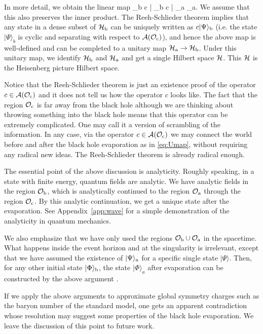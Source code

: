 \documentclass[a4paper,11pt]{article}
\theoremstyle{plain}
\theoremstyle{definition}
\numberwithin{thm}{section}
\newcommand{\ket}[1]{ | {#1} \rangle }
\def\CA{{\cal A}}
\def\CH{{\cal H}}
\def\CO{{\cal O}}
\def\beq#1\eeq{\begin{align}#1\end{align}}
\begin{document}
In more detail, we obtain the linear map
\beq
\CH_{\rm b} \ni c\ket{\Psi}_{\rm b} \mapsto c\ket{\Psi}_{\rm a} \in \CH_{\rm a}. \label{eq:Umap}
\eeq
We assume that this also preserves the inner product. The Reeh-Schlieder theorem implies that any state in a dense subset of $\CH_{\rm b}$ can be uniquely written as $c\ket{\Psi}_{\rm b}$ (i.e.
the state $\ket{\Psi}_b$ is cyclic and separating with respect to $\CA(\CO_{\rm c})$), and hence the above map is well-defined and can be completed to a unitary map $\CH_{\rm a} \to \CH_{\rm b}$.
Under this unitary map, we identify $\CH_{\rm b}$ and $\CH_{\rm a}$ and get a single Hilbert space $\CH$. This $\CH$ is the Heisenberg picture Hilbert space.


Notice that the Reeh-Schlieder theorem is just an existence proof of the operator $c \in \CA(\CO_{\rm c})$ and it does not tell us how the operator $c$ looks like.
The fact that the region $\CO_{\rm c}$ is far away from the black hole although we are thinking about throwing something into the black hole
means that this operator can be extremely complicated. 
One may call it a version of scrambling of the information.  In any case, via the operator $c \in \CA(\CO_{\rm c})$
we may connect the world before and after the black hole evaporation as in \eqref{eq:Umap}, without requiring any radical new ideas.
The Reeh-Schlieder theorem is already radical enough.


The essential point of the above discussion is analyticity. Roughly speaking,
in a state with finite energy, quantum fields are analytic.
We have analytic fields in the region $\CO_{\rm b}$, which is analytically continued to the region $\CO_{\rm a}$ through the region $\CO_{\rm c}$.
By this analytic continuation, we get a unique state after the evaporation.
See Appendix~\ref{app:wave} for a simple demonstration of the analyticity in quantum mechanics.

We also emphasize that we have only used the regions $\CO_{\rm b} \cup \CO_{\rm a}$ in the spacetime.
What happens inside the event horizon and at the singularity is irrelevant, except that 
we have assumed the existence of $\ket{\Psi}_{\rm a}$ for a specific single state $\ket{\Psi}$.
Then, for any other initial state $\ket{\Phi}_{\rm b}$, the state $\ket{\Phi}_a$ after evaporation can be constructed by the above argument .



If we apply the above arguments to approximate global symmetry charges such as the baryon number of the standard model,
one gets an apparent contradiction whose resolution may suggest some properties of the black hole evaporation.
We leave the discussion of this point to future work.
\end{document}

